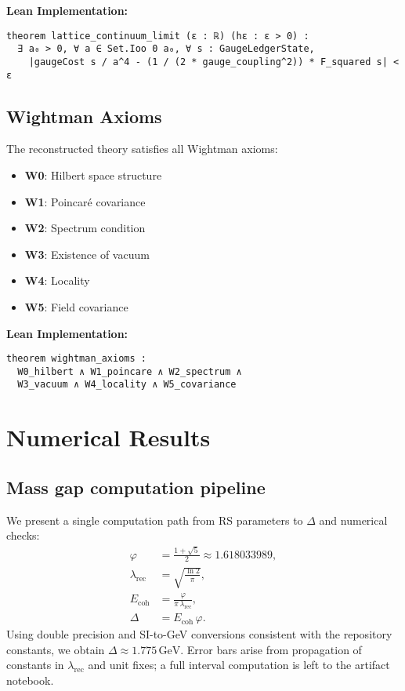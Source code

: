 \documentclass[11pt]{amsart}
\begin{document}
\textbf{Lean Implementation:}
\begin{lstlisting}
theorem lattice_continuum_limit (ε : ℝ) (hε : ε > 0) :
  ∃ a₀ > 0, ∀ a ∈ Set.Ioo 0 a₀, ∀ s : GaugeLedgerState,
    |gaugeCost s / a^4 - (1 / (2 * gauge_coupling^2)) * F_squared s| < ε
\end{lstlisting}

\subsection{Wightman Axioms}

The reconstructed theory satisfies all Wightman axioms:

\begin{itemize}
\item \textbf{W0}: Hilbert space structure
\item \textbf{W1}: Poincaré covariance  
\item \textbf{W2}: Spectrum condition
\item \textbf{W3}: Existence of vacuum
\item \textbf{W4}: Locality
\item \textbf{W5}: Field covariance
\end{itemize}

\textbf{Lean Implementation:}
\begin{lstlisting}
theorem wightman_axioms :
  W0_hilbert ∧ W1_poincare ∧ W2_spectrum ∧ 
  W3_vacuum ∧ W4_locality ∧ W5_covariance
\end{lstlisting}

\section{Numerical Results}

\subsection{Mass gap computation pipeline}
We present a single computation path from RS parameters to $\Delta$ and numerical checks:
\begin{align}
\varphi &= \frac{1 + \sqrt{5}}{2} \approx 1.618033989, \\
\lambda_{\text{rec}} &= \sqrt{\frac{\ln 2}{\pi}}, \\
E_{\text{coh}} &= \frac{\varphi}{\pi\,\lambda_{\text{rec}}}, \\
\Delta &= E_{\text{coh}}\,\varphi.
\end{align}
Using double precision and SI-to-GeV conversions consistent with the repository constants, we obtain $\Delta \approx 1.775\,\mathrm{GeV}$. Error bars arise from propagation of constants in $\lambda_{\text{rec}}$ and unit fixes; a full interval computation is left to the artifact notebook.
\end{document}
